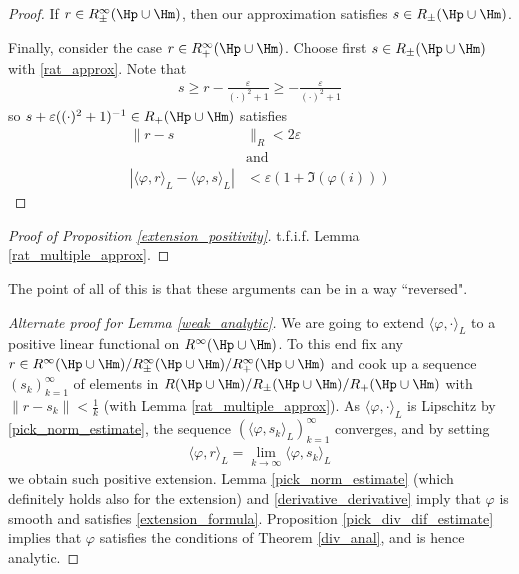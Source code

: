 \begin{proof}
	If $r \in R^{\infty}_{\pm}(\Hp \cup \Hm)$, then our approximation satisfies $s \in R_{\pm}(\Hp \cup \Hm)$.

	Finally, consider the case $r \in R^{\infty}_{+}(\Hp \cup \Hm)$. Choose first $s \in R_{\pm}(\Hp \cup \Hm)$ with \ref{rat_approx}. Note that
	\begin{align*}
		s \geq r - \frac{\varepsilon}{(\cdot)^2 + 1} \geq -\frac{\varepsilon}{(\cdot)^2 + 1}
	\end{align*}
	so $s + \varepsilon ((\cdot)^2 + 1)^{-1} \in R_{+}(\Hp \cup \Hm)$ satisfies
	\begin{align*}
		\|r - s&\|_{R} < 2\varepsilon \nonumber\\
		&\text{and } \\
		|\langle \varphi, r\rangle_{L} -  \langle \varphi, s\rangle_{L}|& < \varepsilon (1 + \Im(\varphi(i)))
	\end{align*}
\end{proof}

\begin{proof}[Proof of Proposition \ref{extension_positivity}]
	t.f.i.f. Lemma \ref{rat_multiple_approx}.
\end{proof}

The point of all of this is that these arguments can be in a way ``reversed".

\begin{proof}[Alternate proof for Lemma \ref{weak_analytic}]
	We are going to extend $\langle \varphi, \cdot\rangle_{L}$ to a positive linear functional on $R^{\infty}(\Hp \cup \Hm)$. To this end fix any $r \in R^{\infty}(\Hp \cup \Hm)/R^{\infty}_{\pm}(\Hp \cup \Hm)/R^{\infty}_{+}(\Hp \cup \Hm)$ and cook up a sequence $(s_{k})_{k = 1}^{\infty}$ of elements in $R(\Hp \cup \Hm)/R_{\pm}(\Hp \cup \Hm)/R_{+}(\Hp \cup \Hm)$ with $\|r - s_{k}\| < \frac{1}{k}$ (with Lemma \ref{rat_multiple_approx}). As $\langle \varphi, \cdot\rangle_{L}$ is Lipschitz by \ref{pick_norm_estimate}, the sequence $(\langle \varphi, s_{k} \rangle_{L})_{k = 1}^{\infty}$ converges, and by setting
	\begin{align*}
		\langle \varphi, r\rangle_{L} = \lim_{k \to \infty} \langle \varphi, s_{k}\rangle_{L}
	\end{align*}
	we obtain such positive extension. Lemma \ref{pick_norm_estimate} (which definitely holds also for the extension) and \ref{derivative_derivative} imply that $\varphi$ is smooth and satisfies \ref{extension_formula}. Proposition \ref{pick_div_dif_estimate} implies that $\varphi$ satisfies the conditions of Theorem \ref{div_anal}, and is hence analytic.
\end{proof}

